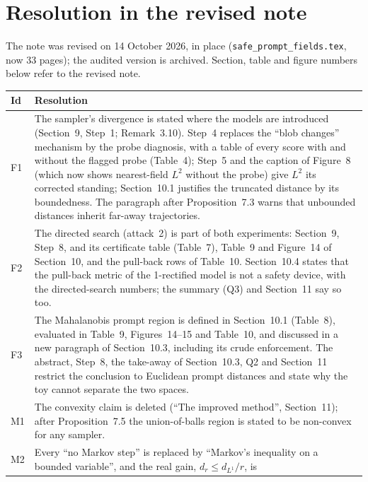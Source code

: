 \documentclass[11pt]{article}
\newcommand{\file}[1]{\texttt{#1}}
\begin{document}
\endgroup

\section{Resolution in the revised note}\label{sec:resolution}
The note was revised on 14 October 2026, in place (\file{safe\_prompt\_fields.tex}, now 33 pages); the audited version is archived.
Section, table and figure numbers below refer to the revised note.

\renewcommand{\arraystretch}{1.15}
\begin{longtable}{@{}p{1.0cm}>{\raggedright\arraybackslash}p{15.2cm}@{}}
\toprule
\textbf{Id} & \textbf{Resolution}\\
\midrule
\endhead
F1 & The sampler's divergence is stated where the models are introduced (Section~9, Step~1; Remark~3.10). Step~4 replaces the ``blob
changes'' mechanism by the probe diagnosis, with a table of every score with and without the flagged probe (Table~4); Step~5 and the caption of
Figure~8 (which now shows nearest-field $L^2$ without the probe) give $L^2$ its corrected standing; Section~10.1 justifies the truncated
distance by its boundedness. The paragraph after Proposition~7.3 warns that unbounded distances inherit far-away trajectories.\\
F2 & The directed search (attack~2) is part of both experiments: Section~9, Step~8, and its certificate table (Table~7), Table~9 and
Figure~14 of Section~10, and the pull-back rows of Table~10. Section~10.4 states that the pull-back metric of the 1-rectified model is
not a safety device, with the directed-search numbers; the summary (Q3) and Section~11 say so too.\\
F3 & The Mahalanobis prompt region is defined in Section~10.1 (Table~8), evaluated in Table~9, Figures~14--15 and Table~10, and
discussed in a new paragraph of Section~10.3, including its crude enforcement. The abstract, Step~8, the take-away of Section~10.3,
Q2 and Section~11 restrict the conclusion to Euclidean prompt distances and state why the toy cannot separate the two spaces.\\
M1 & The convexity claim is deleted (``The improved method'', Section~11); after Proposition~7.5 the union-of-balls region is stated
to be non-convex for any sampler.\\
M2 & Every ``no Markov step'' is replaced by ``Markov's inequality on a bounded variable'', and the real gain, $d_r\le d_{L^1}/r$, is

\end{longtable}
\end{document}
